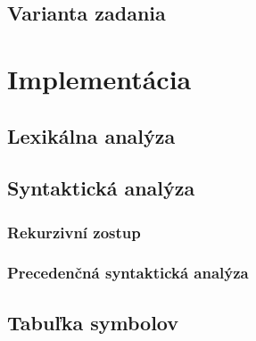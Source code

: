 \documentclass{article}
\begin{document}
        \subsection{Varianta zadania}
    
    \section{Implementácia}
    
        \subsection{Lexikálna analýza}
        
        \subsection{Syntaktická analýza}
            \subsubsection{Rekurzivní zostup}
            \subsubsection{Precedenčná syntaktická analýza}
    
        \subsection{Tabuľka symbolov}
        
\end{document}
